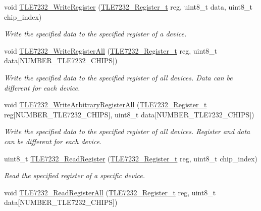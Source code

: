 \begin{DoxyCompactItemize}
void \hyperlink{group__tle7232__driver_gabf56c66110adfb8658cff9c2f6fc5cd6}{T\-L\-E7232\-\_\-\-Write\-Register} (\hyperlink{group__tle7232__driver_gabd1d28f92015db8d6a418c8346f4b4ff}{T\-L\-E7232\-\_\-\-Register\-\_\-t} reg, uint8\-\_\-t data, uint8\-\_\-t chip\-\_\-index)
\begin{DoxyCompactList}\small\item\em Write the specified data to the specified register of a device. \end{DoxyCompactList}\item 
void \hyperlink{group__tle7232__driver_ga082ee2578c277c689e4ce6c0647cdcf5}{T\-L\-E7232\-\_\-\-Write\-Register\-All} (\hyperlink{group__tle7232__driver_gabd1d28f92015db8d6a418c8346f4b4ff}{T\-L\-E7232\-\_\-\-Register\-\_\-t} reg, uint8\-\_\-t data\mbox{[}N\-U\-M\-B\-E\-R\-\_\-\-T\-L\-E7232\-\_\-\-C\-H\-I\-P\-S\mbox{]})
\begin{DoxyCompactList}\small\item\em Write the specified data to the specified register of all devices. Data can be different for each device. \end{DoxyCompactList}\item 
void \hyperlink{group__tle7232__driver_gaf3e85d7d9a54143703684223ac382b9e}{T\-L\-E7232\-\_\-\-Write\-Arbitrary\-Register\-All} (\hyperlink{group__tle7232__driver_gabd1d28f92015db8d6a418c8346f4b4ff}{T\-L\-E7232\-\_\-\-Register\-\_\-t} reg\mbox{[}N\-U\-M\-B\-E\-R\-\_\-\-T\-L\-E7232\-\_\-\-C\-H\-I\-P\-S\mbox{]}, uint8\-\_\-t data\mbox{[}N\-U\-M\-B\-E\-R\-\_\-\-T\-L\-E7232\-\_\-\-C\-H\-I\-P\-S\mbox{]})
\begin{DoxyCompactList}\small\item\em Write the specified data to the specified register of all devices. Register and data can be different for each device. \end{DoxyCompactList}\item 
uint8\-\_\-t \hyperlink{group__tle7232__driver_ga5d2ff3c331e9b1bd5d1d4522ffc92b5d}{T\-L\-E7232\-\_\-\-Read\-Register} (\hyperlink{group__tle7232__driver_gabd1d28f92015db8d6a418c8346f4b4ff}{T\-L\-E7232\-\_\-\-Register\-\_\-t} reg, uint8\-\_\-t chip\-\_\-index)
\begin{DoxyCompactList}\small\item\em Read the specified register of a specific device. \end{DoxyCompactList}\item 
void \hyperlink{group__tle7232__driver_ga69d5853d67c276595fc03169822f65f9}{T\-L\-E7232\-\_\-\-Read\-Register\-All} (\hyperlink{group__tle7232__driver_gabd1d28f92015db8d6a418c8346f4b4ff}{T\-L\-E7232\-\_\-\-Register\-\_\-t} reg, uint8\-\_\-t data\mbox{[}N\-U\-M\-B\-E\-R\-\_\-\-T\-L\-E7232\-\_\-\-C\-H\-I\-P\-S\mbox{]})

\end{DoxyCompactItemize}
